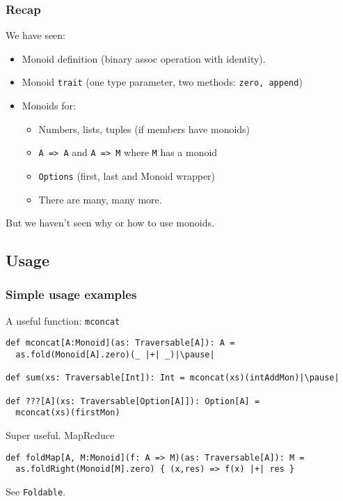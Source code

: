 \documentclass{beamer}
\begin{document}
\begin{frame} \frametitle{Recap}
  We have seen:
  \begin{itemize}
    \item Monoid definition (binary assoc operation with identity).
    \item Monoid \texttt{trait} (one type parameter,
      two methods: \texttt{zero, append})
    \item Monoids for:
      \begin{itemize}
      \item Numbers, lists, tuples (if members have monoids)
      \item \texttt{A => A} and \texttt{A => M} where \texttt{M} has a monoid
      \item \texttt{Options} (first, last and Monoid wrapper)
      \item There are many, many more.
      \end{itemize}
  \end{itemize}

  \begin{block}{}
    \centering
    But we haven't seen \alert{why} or \alert{how} to use monoids.
  \end{block}
\end{frame}

\subsection{Usage}
\begin{frame}[fragile]
  \frametitle{Simple usage examples}

  \begin{block}{A useful function: \texttt{mconcat}}
  \begin{lstlisting}[escapechar=\|]
def mconcat[A:Monoid](as: Traversable[A]): A =
  as.fold(Monoid[A].zero)(_ |+| _)|\pause|

def sum(xs: Traversable[Int]): Int = mconcat(xs)(intAddMon)|\pause|

def ???[A](xs: Traversable[Option[A]]): Option[A] =
  mconcat(xs)(firstMon)
  \end{lstlisting}
  \end{block}

  \pause
  \begin{block}{Super useful. MapReduce}
  \begin{lstlisting}
def foldMap[A, M:Monoid](f: A => M)(as: Traversable[A]): M =
  as.foldRight(Monoid[M].zero) { (x,res) => f(x) |+| res }
  \end{lstlisting}
  \end{block}
  See \texttt{Foldable}.
\end{frame}
\end{document}

